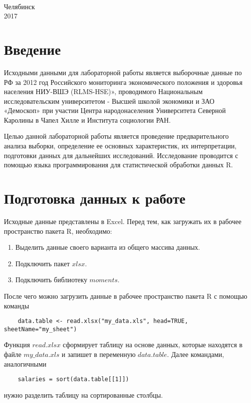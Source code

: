 \documentclass[12pt,a4paper,titlepage]{article}
\begin{document}
\begin{titlepage}
\begin{center}
{\begin{tabular}[t]{lllllllllllllllllll}
\end{tabular}
\\[1.5cm]}

\small{Челябинск}\\
\small{2017}
\end{center}
\end{titlepage}
\tableofcontents
\section{Введение}
  \par
  Исходными данными для лабораторной работы является выборочные данные по РФ за 2012 год Российского мониторинга экономического положения и здоровья населения НИУ-ВШЭ (RLMS-HSE)», проводимого Национальным исследовательским университетом - Высшей школой экономики и ЗАО «Демоскоп» при участии Центра народонаселения Университета Северной Каролины в Чапел Хилле и Института социологии РАН.

  \par
  Целью данной лабораторной работы является проведение предварительного анализа выборки, определение ее основных характеристик, их интерпретации, подготовки данных для дальнейших исследований.
  Исследование проводится с помощью языка программирования для статистической обработки данных R.

\section{Подготовка данных к работе}
  Исходные данные представлены в Excel.
  Перед тем, как загружать их в рабочее пространство пакета R, необходимо:
  \begin{enumerate}
    \item Выделить данные своего варианта из общего массива данных.
    \item Подключить пакет $xlsx$.
    \item Подключить библиотеку $moments$.
  \end{enumerate}

  После чего можно загрузить данные в рабочее пространство пакета R с помощью команды
  \begin{lstlisting}
    data.table <- read.xlsx("my_data.xls", head=TRUE, sheetName="my_sheet")
  \end{lstlisting}

  Функция $read.xlsx$ сформирует таблицу на основе данных, которые находятся в файле $my\_data.xls$ и запишет в переменную $data.table$.
  Далее командами, аналогичными
  \begin{lstlisting}
    salaries = sort(data.table[[1]])
  \end{lstlisting}
  нужно разделить таблицу на сортированные столбцы. 
\clearpage
\end{document}
